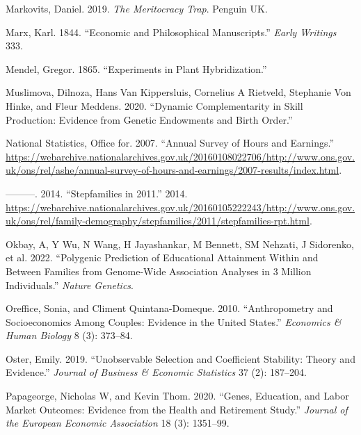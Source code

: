 \documentclass[
]{article}
\newlength{\cslhangindent}
\newlength{\cslentryspacingunit} %
\newenvironment{CSLReferences}[2] %
 {%
  \setlength{\parindent}{0pt}
  \ifodd #1
  \let\oldpar\par
  \def\par{\hangindent=\cslhangindent\oldpar}
  \fi
  \setlength{\parskip}{#2\cslentryspacingunit}
 }%
 {}
\theoremstyle{definition}
\theoremstyle{definition}
\theoremstyle{definition}
\theoremstyle{definition}
\theoremstyle{remark}
\begin{document}
\begin{CSLReferences}{1}{0}
\leavevmode{}%
Markovits, Daniel. 2019. \emph{The Meritocracy Trap}. Penguin UK.

\leavevmode{}%
Marx, Karl. 1844. {``Economic and Philosophical Manuscripts.''} \emph{Early Writings} 333.

\leavevmode{}%
Mendel, Gregor. 1865. {``Experiments in Plant Hybridization.''}

\leavevmode{}%
Muslimova, Dilnoza, Hans Van Kippersluis, Cornelius A Rietveld, Stephanie Von Hinke, and Fleur Meddens. 2020. {``Dynamic Complementarity in Skill Production: Evidence from Genetic Endowments and Birth Order.''}

\leavevmode{}%
National Statistics, Office for. 2007. {``Annual Survey of Hours and Earnings.''} \url{https://webarchive.nationalarchives.gov.uk/20160108022706/http://www.ons.gov.uk/ons/rel/ashe/annual-survey-of-hours-and-earnings/2007-results/index.html}.

\leavevmode{}%
---------. 2014. {``Stepfamilies in 2011.''} 2014. \url{https://webarchive.nationalarchives.gov.uk/20160105222243/http://www.ons.gov.uk/ons/rel/family-demography/stepfamilies/2011/stepfamilies-rpt.html}.

\leavevmode{}%
Okbay, A, Y Wu, N Wang, H Jayashankar, M Bennett, SM Nehzati, J Sidorenko, et al. 2022. {``Polygenic Prediction of Educational Attainment Within and Between Families from Genome-Wide Association Analyses in 3 Million Individuals.''} \emph{Nature Genetics}.

\leavevmode{}%
Oreffice, Sonia, and Climent Quintana-Domeque. 2010. {``Anthropometry and Socioeconomics Among Couples: Evidence in the United States.''} \emph{Economics \& Human Biology} 8 (3): 373--84.

\leavevmode{}%
Oster, Emily. 2019. {``Unobservable Selection and Coefficient Stability: Theory and Evidence.''} \emph{Journal of Business \& Economic Statistics} 37 (2): 187--204.

\leavevmode{}%
Papageorge, Nicholas W, and Kevin Thom. 2020. {``Genes, Education, and Labor Market Outcomes: Evidence from the Health and Retirement Study.''} \emph{Journal of the European Economic Association} 18 (3): 1351--99.


\end{CSLReferences}
\end{document}
